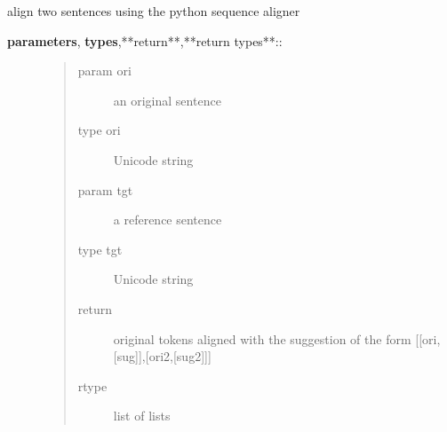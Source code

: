 \documentclass[letterpaper,10pt,english]{sphinxmanual}
\begin{document}
\begin{fulllineitems}
\label{API:norm.util.align}
align two sentences using the python sequence aligner
\begin{description}
\item[{\textbf{parameters}, \textbf{types},**return**,**return types**::}] \leavevmode\begin{quote}\begin{description}
\item[{param ori}] \leavevmode
an original sentence

\item[{type ori}] \leavevmode
Unicode string

\item[{param tgt}] \leavevmode
a reference sentence

\item[{type tgt}] \leavevmode
Unicode string

\item[{return}] \leavevmode
original tokens aligned with the suggestion of the form {[}{[}ori,{[}sug{]}{]},{[}ori2,{[}sug2{]}{]}{]}

\item[{rtype}] \leavevmode
list of lists

\end{description}\end{quote}

\end{description}

\end{fulllineitems}

\end{document}
